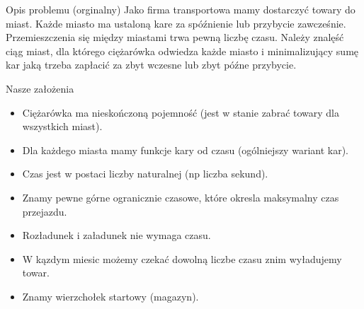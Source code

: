 \begin{frame}
	\begin{block}{Opis problemu (orginalny)}
		Jako firma transportowa mamy dostarczyć towary do miast. 
		Każde miasto ma ustaloną kare za spóźnienie lub przybycie zawcześnie. 
		Przemieszczenia się między miastami trwa pewną liczbę czasu.
		Należy znalęść ciąg miast, dla którego ciężarówka odwiedza każde miasto i minimalizujący sumę kar jaką trzeba zapłacić za zbyt wczesne lub zbyt późne przybycie.
	\end{block}
\end{frame}

\begin{frame}
	\begin{block}{Nasze założenia}
		\begin{itemize}
			\item Ciężarówka ma nieskończoną pojemność (jest w stanie zabrać towary dla wszystkich miast).
			\item Dla każdego miasta mamy funkcje kary od czasu (ogólniejszy wariant kar).
			\item Czas jest w postaci liczby naturalnej (np liczba sekund).
			\item Znamy pewne górne ogranicznie czasowe, które okresla maksymalny czas przejazdu.
			\item Rozładunek i załadunek nie wymaga czasu.
			\item W kązdym miesic możemy czekać dowolną liczbe czasu znim wyładujemy towar.
			\item Znamy wierzchołek startowy (magazyn).
		\end{itemize}
	\end{block}
\end{frame}

